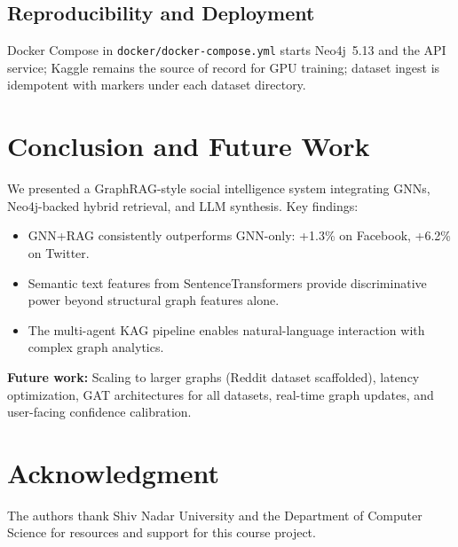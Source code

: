 \documentclass[conference]{IEEEtran}
\begin{document}
\subsection{Reproducibility and Deployment}
Docker Compose in \texttt{docker/docker-compose.yml} starts Neo4j~5.13 and the API service; Kaggle remains the source of record for GPU training; dataset ingest is idempotent with markers under each dataset directory.

\section{Conclusion and Future Work}

We presented a GraphRAG-style social intelligence system integrating GNNs, Neo4j-backed hybrid retrieval, and LLM synthesis. Key findings:
\begin{itemize}
  \item GNN+RAG consistently outperforms GNN-only: +1.3\% on Facebook, +6.2\% on Twitter.
  \item Semantic text features from SentenceTransformers provide discriminative power beyond structural graph features alone.
  \item The multi-agent KAG pipeline enables natural-language interaction with complex graph analytics.
\end{itemize}

\textbf{Future work:} Scaling to larger graphs (Reddit dataset scaffolded), latency optimization, GAT architectures for all datasets, real-time graph updates, and user-facing confidence calibration.

\section*{Acknowledgment}
The authors thank Shiv Nadar University and the Department of Computer Science for resources and support for this course project.
\end{document}
